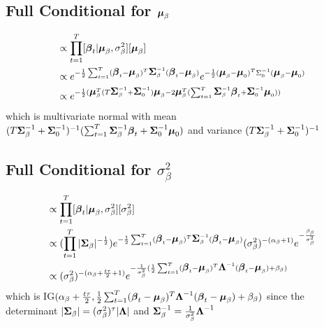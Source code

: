 \documentclass[fleqn]{article}
\def\bm#1{\mbox{\boldmath $#1$}}
\begin{document}
\subsection{Full Conditional for $\bm{\mu}_\beta$}
%
\begin{align*}
[\bm{\mu}_\beta | \cdot] & \propto \prod_{t = 1}^T [\bm{\beta}_t | \bm{\mu}_\beta, \sigma^2_\beta] [\bm{\mu}_\beta]\\
%
& \propto e^{ - \frac{1} {2} \sum_{t = 1}^T (\bm{\beta}_t - \bm{\mu}_\beta)^T \bm{\Sigma}_\beta^{ - 1} (\bm{\beta}_t - \bm{\mu}_\beta)} e^{ - \frac{1} {2} (\bm{\mu}_\beta - \bm{\mu}_0)^T \Sigma_0^{ - 1} (\bm{\mu}_\beta - \bm{\mu}_0)}\\
%
& \propto e^{ - \frac{1} {2} (
\bm{\mu}_\beta^T (T \bm{\Sigma}_\beta^{ - 1} + \bm{\Sigma}_0^{ - 1}) \bm{\mu}_\beta - 2 \bm{\mu}_\beta^T (\sum_{t = 1}^T \bm{\Sigma}_\beta^{ - 1} \bm{\beta}_t + \bm{\Sigma}_0^{ - 1} \bm{\mu}_0) ) }
\end{align*}
%
which is multivariate normal with mean
$(T \bm{\Sigma}_\beta^{ - 1} + \bm{\Sigma}_0^{ - 1})^{ - 1} (\sum_{t = 1}^T \bm{\Sigma}_\beta^{ - 1} \bm{\beta}_t + \bm{\Sigma}_0^{ - 1} \bm{\mu}_0)$ and variance $(T \bm{\Sigma}_\beta^{ - 1} + \bm{\Sigma}_0^{ - 1})^{ - 1}$
%
\subsection{Full Conditional for $\sigma^2_\beta$}
%
\begin{align*}
[\sigma^2_\beta | \cdot] & \propto \prod_{t = 1}^T [\bm{\beta}_t | \bm{\mu}_\beta, \sigma^2_\beta] [\sigma^2_\beta]\\
%
& \propto (\prod_{t = 1}^T |\bm{\Sigma}_\beta|^{ - \frac{1} {2}}) e^{ - \frac{1} {2} \sum_{t = 1}^T (\bm{\beta}_t - \bm{\mu}_\beta)^T \bm{\Sigma}_\beta^{ - 1} (\bm{\beta}_t - \bm{\mu}_\beta)} (\sigma^2_\beta)^{ - (\alpha_\beta + 1)} e^{ - \frac{\beta_\beta} {\sigma^2_\beta}}\\
%
& \propto (\sigma^2_\beta)^{ - (\alpha_\beta + \frac{t \tau} {2} + 1)} e^{ - \frac{1} {\sigma^2_\beta} (\frac{1} {2} \sum_{t = 1}^T (\bm{\beta}_t - \bm{\mu}_\beta)^T \bm{\Lambda}^{ - 1} (\bm{\beta}_t - \bm{\mu}_\beta) + \beta_\beta)}
\end{align*}
%
which is IG$(\alpha_\beta + \frac{t \tau} {2}, \frac{1} {2} \sum_{t = 1}^T (\bm{\beta}_t - \bm{\mu}_\beta)^T \bm{\Lambda}^{ - 1} (\bm{\beta}_t - \bm{\mu}_\beta) + \beta_\beta)$ since the determinant $|\bm{\Sigma}_\beta| = (\sigma^2_\beta)^{\tau} | \bm{\Lambda} |$ and $\bm{\Sigma}_\beta^{ - 1} = \frac{1} {\sigma^2_\beta} \bm{\Lambda}^{ - 1}$
%
\end{document}
